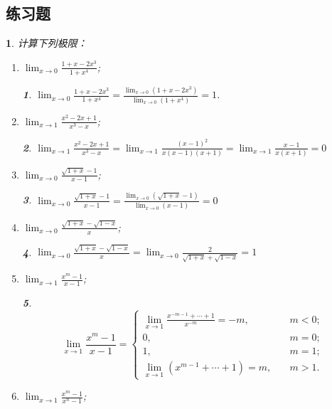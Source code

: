 \documentclass[utf8]{book}
\newtheorem{example}{}[section]             %
\newtheorem{solution}{}
\begin{document}
\subsection{练习题}
\begin{example}
计算下列极限：
\renewcommand\labelenumi{\normalfont(\theenumi)}
\begin{enumerate}
\item $\displaystyle\lim_{x\to 0}\frac{1+x-2x^3}{1+x^4}$;
\begin{solution}
$\displaystyle\lim_{x\to 0}\frac{1+x-2x^3}{1+x^4} = \frac{\displaystyle\lim_{x\to 0}(1+x-2x^3)}{\displaystyle\lim_{x\to 0}(1+x^4)} =1$.
\end{solution}
\item $\displaystyle\lim_{x\to 1}\frac{x^2-2x+1}{x^3-x}$;
\begin{solution}
$\displaystyle\lim_{x\to 1}\frac{x^2-2x+1}{x^3-x}=\displaystyle\lim_{x\to 1}\frac{(x-1)^2}{x(x-1)(x+1)}=\displaystyle\lim_{x\to 1}\frac{x-1}{x(x+1)}=0$
\end{solution}
\item $\displaystyle\lim_{x\to 0}\frac{\sqrt{1+x}-1}{x-1}$;
\begin{solution}
$\displaystyle\lim_{x\to 0}\frac{\sqrt{1+x}-1}{x-1}=\frac{\displaystyle\lim_{x\to 0}(\sqrt{1+x}-1)}{\displaystyle\lim_{x\to 0}(x-1)} = 0$
\end{solution}
\item $\displaystyle\lim_{x\to 0}\frac{\sqrt{1+x}-\sqrt{1-x}}{x}$;
\begin{solution}
$\displaystyle\lim_{x\to 0}\frac{\sqrt{1+x}-\sqrt{1-x}}{x}=\displaystyle\lim_{x\to 0}\frac{2}{\sqrt{1+x}+\sqrt{1-x}} = 1$
\end{solution}
\item $\displaystyle\lim_{x\to 1}\frac{x^m-1}{x-1}$;
\begin{solution}
\begin{equation*}
\displaystyle\lim_{x\to 1}\frac{x^m-1}{x-1}=
\begin{cases}
\displaystyle\lim_{x\to 1}\frac{x^{-m-1} + \cdots +1}{x^{-m}}=-m, \quad&m<0;\\
0,\quad&m=0;\\
1,\quad&m=1;\\
\displaystyle\lim_{x\to 1}(x^{m-1} + \cdots +1)=m, \quad&m>1.
\end{cases}
\end{equation*}
\end{solution}
\item $\displaystyle\lim_{x\to 1}\frac{x^m-1}{x^n-1}$;

\end{enumerate}
\end{example}
\end{document}
